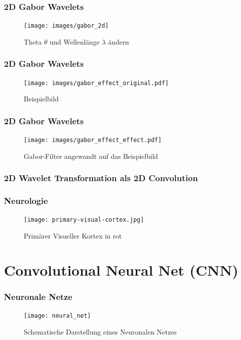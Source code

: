 \documentclass{beamer}
\begin{document}
\begin{frame}
\frametitle{2D Gabor Wavelets}
	\begin{figure}
		\centering
		\texttt{[image: images/gabor\_2d]}
		\caption{Theta $\theta$ und Wellenlänge $\lambda$ ändern}
		\label{fig:gabor2d}
	\end{figure}	

\end{frame}

\begin{frame}
\frametitle{2D Gabor Wavelets}
\begin{figure}
	\centering
	\texttt{[image: images/gabor\_effect\_original.pdf]}
	\caption{Beispielbild}
	\label{fig:gabororiginal}
\end{figure}	
\end{frame}

\begin{frame}
\frametitle{2D Gabor Wavelets}
\begin{figure}
	\centering
	\texttt{[image: images/gabor\_effect\_effect.pdf]}
	\caption{Gabor-Filter angewandt auf das Beispielbild}
	\label{fig:gaboreffect}
\end{figure}	

\end{frame}

\begin{frame}
\frametitle{2D Wavelet Transformation als 2D Convolution}
	
\end{frame}


\begin{frame}
	\frametitle{Neurologie}
	\begin{figure}
		\centering
		\texttt{[image: primary-visual-cortex.jpg]}
		\caption{Primärer Visueller Kortex in rot}
		\label{fig:primary-visual-cortex}
	\end{figure}
	
\end{frame}

\section{Convolutional Neural Net (CNN)}
\begin{frame}
\frametitle{Neuronale Netze}
\begin{figure}
	\centering
	\texttt{[image: neural\_net]}
	\caption{Schematische Darstellung eines Neuronalen Netzes}
	\label{fig:neuralnet}
\end{figure}

\end{frame}
\end{document}
